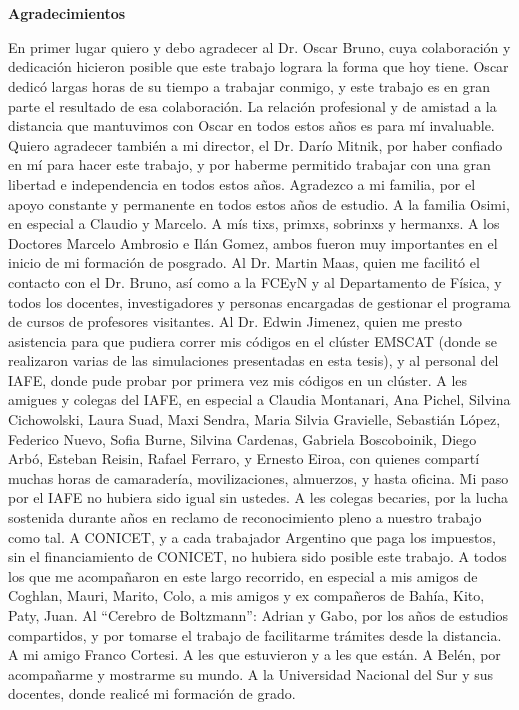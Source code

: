 \pagestyle{empty}
\chapter*{}

\begin{center}
\begin{large}
\textbf{Agradecimientos}
\end{large}
\end{center}

\vspace{1cm}
En primer lugar quiero y debo agradecer al Dr. Oscar Bruno, cuya 
colaboración y dedicación hicieron posible que 
este trabajo lograra la forma que hoy tiene. Oscar dedicó largas 
horas de su tiempo a trabajar conmigo, 
y este trabajo es en gran parte el resultado de esa colaboración. 
La relación profesional y de amistad a la distancia que mantuvimos 
con Oscar en todos estos años es para mí invaluable. 
Quiero agradecer también a mi director, el Dr. Darío Mitnik, por 
haber confiado en mí para hacer este trabajo, y por haberme permitido 
trabajar con una gran libertad e independencia en todos estos años. 
Agradezco a mi familia, por el apoyo constante y permanente 
en todos estos años de estudio. A la familia Osimi, en especial a 
Claudio y Marcelo. A mís tixs, primxs, sobrinxs y hermanxs.
A los Doctores Marcelo Ambrosio e Ilán Gomez, 
ambos fueron muy importantes en el inicio de mi formación de posgrado. 
Al Dr. Martin Maas, quien me facilitó el contacto con el Dr. Bruno, 
así como a la FCEyN y al Departamento de Física, y todos los docentes, 
investigadores y personas encargadas de gestionar el programa de cursos de profesores visitantes. 
Al Dr. Edwin 
Jimenez, quien me presto asistencia para que pudiera correr mis códigos 
en el clúster EMSCAT (donde se realizaron varias de las simulaciones 
presentadas en esta tesis), y al personal del IAFE, 
donde pude probar por primera vez mis códigos en un clúster.
 A les amigues y colegas del IAFE, en especial a 
Claudia Montanari, Ana Pichel, Silvina Cichowolski, Laura Suad, Maxi Sendra, Maria Silvia Gravielle, Sebastián López, 
Federico Nuevo, Sofia Burne, Silvina Cardenas, Gabriela Boscoboinik, Diego Arbó, Esteban Reisin, Rafael Ferraro,  y Ernesto Eiroa, con quienes 
compartí muchas horas de camaradería, movilizaciones, almuerzos, y hasta oficina. 
Mi paso por el IAFE no hubiera sido igual sin ustedes. 
A les colegas becaries, por la lucha sostenida durante años en reclamo de 
reconocimiento pleno a nuestro trabajo como tal. 
A CONICET, y a cada trabajador Argentino que paga los impuestos, 
sin el financiamiento de CONICET, no hubiera sido posible este trabajo. 
A todos los que me acompañaron en este largo recorrido, 
en especial a mis amigos de Coghlan, Mauri, Marito, Colo, a mis amigos y 
ex compañeros de Bahía, Kito, Paty, Juan. Al ``Cerebro de Boltzmann'': Adrian y Gabo, por 
los años de estudios compartidos, y por tomarse el trabajo de facilitarme trámites desde la distancia. A mi amigo Franco Cortesi. A les que estuvieron y a les que están. A Belén, 
por acompañarme y mostrarme su mundo. A la Universidad Nacional del Sur y sus 
docentes, donde realicé mi formación de grado.

